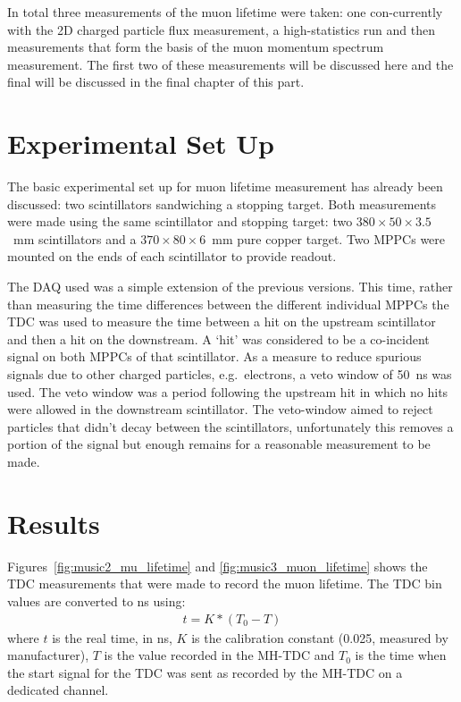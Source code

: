 In total three measurements of the muon lifetime were taken: one con-currently with the 2D charged particle flux measurement, a high-statistics run and then measurements that form the basis of the muon momentum spectrum measurement. The first two of these measurements will be discussed here and the final will be discussed in the final chapter of this part.

\section{Experimental Set Up} %
\label{sec:experimental_set_up}
The basic experimental set up for muon lifetime measurement has already been discussed: two scintillators sandwiching a stopping target. Both measurements were made using the same scintillator and stopping target: two \( 380\times50\times3.5 \)~mm scintillators and a \( 370\times80\times6 \)~mm pure copper target. Two MPPCs were mounted on the ends of each scintillator to provide readout. 

The DAQ used was a simple extension of the previous versions. This time, rather than measuring the time differences between the different individual MPPCs the TDC was used to measure the time between a hit on the upstream scintillator and then a hit on the downstream. A `hit' was considered to be a co-incident signal on both MPPCs of that scintillator. As a measure to reduce spurious signals due to other charged particles, e.g.\ electrons, a veto window of 50~ns was used. The veto window was a period following the upstream hit in which no hits were allowed in the downstream scintillator. The veto-window aimed to reject particles that didn't decay between the scintillators, unfortunately this removes a portion of the signal but enough remains for a reasonable measurement to be made.

\section{Results} %
\label{sec:results} 
Figures~\ref{fig:music2_mu_lifetime} and \ref{fig:music3_muon_lifetime} shows the TDC measurements that were made to record the muon lifetime. The TDC bin values are converted to ns using:
\begin{align}
  t = K*(T_0-T)
\end{align}
where \( t \) is the real time, in ns, \( K \) is the calibration constant (0.025, measured by manufacturer), \( T \) is the value recorded in the MH-TDC and \( T_0 \) is the time when the start signal for the TDC was sent as recorded by the MH-TDC on a dedicated channel.

